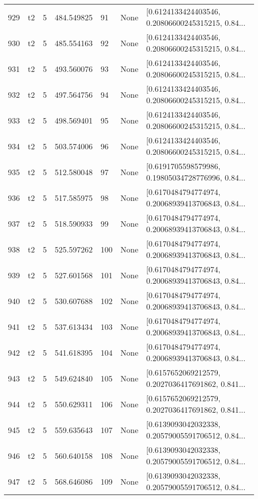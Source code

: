 \begin{tabular}{lllrlll}
929 &  t2 &   5 &   484.549825 &   91 &  None &  [0.6124133424403546, 0.20806600245315215, 0.84... \\
930 &  t2 &   5 &   485.554163 &   92 &  None &  [0.6124133424403546, 0.20806600245315215, 0.84... \\
931 &  t2 &   5 &   493.560076 &   93 &  None &  [0.6124133424403546, 0.20806600245315215, 0.84... \\
932 &  t2 &   5 &   497.564756 &   94 &  None &  [0.6124133424403546, 0.20806600245315215, 0.84... \\
933 &  t2 &   5 &   498.569401 &   95 &  None &  [0.6124133424403546, 0.20806600245315215, 0.84... \\
934 &  t2 &   5 &   503.574006 &   96 &  None &  [0.6124133424403546, 0.20806600245315215, 0.84... \\
935 &  t2 &   5 &   512.580048 &   97 &  None &  [0.6191705598579986, 0.19805034728776996, 0.84... \\
936 &  t2 &   5 &   517.585975 &   98 &  None &  [0.6170484794774974, 0.20068939413706843, 0.84... \\
937 &  t2 &   5 &   518.590933 &   99 &  None &  [0.6170484794774974, 0.20068939413706843, 0.84... \\
938 &  t2 &   5 &   525.597262 &  100 &  None &  [0.6170484794774974, 0.20068939413706843, 0.84... \\
939 &  t2 &   5 &   527.601568 &  101 &  None &  [0.6170484794774974, 0.20068939413706843, 0.84... \\
940 &  t2 &   5 &   530.607688 &  102 &  None &  [0.6170484794774974, 0.20068939413706843, 0.84... \\
941 &  t2 &   5 &   537.613434 &  103 &  None &  [0.6170484794774974, 0.20068939413706843, 0.84... \\
942 &  t2 &   5 &   541.618395 &  104 &  None &  [0.6170484794774974, 0.20068939413706843, 0.84... \\
943 &  t2 &   5 &   549.624840 &  105 &  None &  [0.6157652069212579, 0.2027036417691862, 0.841... \\
944 &  t2 &   5 &   550.629311 &  106 &  None &  [0.6157652069212579, 0.2027036417691862, 0.841... \\
945 &  t2 &   5 &   559.635643 &  107 &  None &  [0.6139093042032338, 0.20579005591706512, 0.84... \\
946 &  t2 &   5 &   560.640158 &  108 &  None &  [0.6139093042032338, 0.20579005591706512, 0.84... \\
947 &  t2 &   5 &   568.646086 &  109 &  None &  [0.6139093042032338, 0.20579005591706512, 0.84... \\

\end{tabular}
